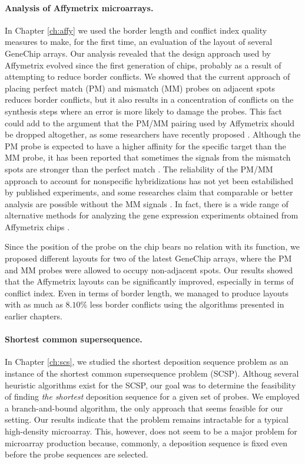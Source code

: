 \paragraph{Analysis of Affymetrix microarrays.} In Chapter \ref{ch:affy} we used
the border length and conflict index quality measures to make, for the first time, an
evaluation of the layout of several GeneChip arrays. Our analysis
revealed that the design approach used by Affymetrix
evolved since the first generation of chips, probably as a result of attempting
to reduce border conflicts. We showed that the current approach of placing
perfect match (PM) and mismatch (MM) probes on adjacent spots reduces
border conflicts, but it also results in a concentration of
conflicts on the synthesis steps where an error is more likely to damage the
probes. This fact could add to the argument that the PM/MM pairing used by
Affymetrix should be dropped altogether, as some researchers have recently
proposed \citep{Lauren2003}. Although the PM probe is expected to have a higher
affinity for the specific target than the MM probe, it has been reported that
sometimes the signals from the mismatch spots are stronger than the perfect
match \citep{Naef2003}. The reliability of the PM/MM approach to account for
nonspecific hybridizations has not yet been estabilished by published
experiments, and some researches claim that comparable or better analysis are
possible without the MM signals \citep{Irizarry2003}. In fact, there is a wide
range of alternative methods for analyzing the gene expression experiments
obtained from Affymetrix chips \citep{Irizarry2006,Millenaar2006}.

Since the position of the probe on the chip bears no relation with its function,
we proposed different layouts for two of the latest GeneChip arrays, where the
PM and MM probes were allowed to occupy non-adjacent spots. Our results showed
that the Affymetrix layouts can be significantly improved, especially in terms
of conflict index. Even in terms of border length, we managed to produce layouts
with as much as $8.10\%$ less border conflicts using the algorithms presented in
earlier chapters.

\paragraph{Shortest common supersequence.}
In Chapter \ref{ch:scs}, we studied the shortest deposition sequence problem as
an instance of the shortest common supersequence problem (SCSP). Althoug several
heuristic algorithms exist for the SCSP, our goal was to determine the
feasibility of finding \emph{the shortest} deposition sequence for a given set
of probes. We employed a branch-and-bound algorithm, the only approach that
seems feasible for our setting. Our results indicate that the problem remains
intractable for a typical high-density microarray. This, however, does not seem
to be a major problem for microarray production because, commonly, a deposition
sequence is fixed even before the probe sequences are selected.

